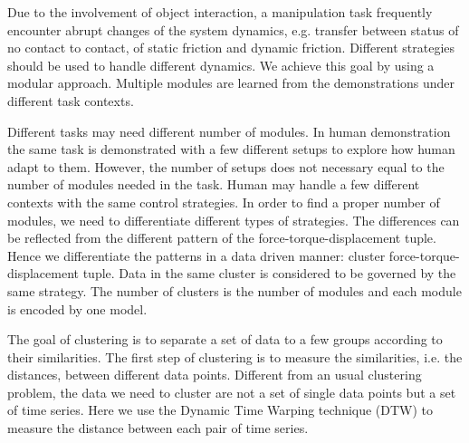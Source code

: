 \documentclass[preprint,12pt]{elsarticle}
\begin{document}
Due to the involvement of object interaction, a manipulation task frequently encounter abrupt changes of the system dynamics, e.g. transfer between status of no contact to contact, of static friction and dynamic friction. Different strategies should be used to handle different dynamics. We achieve this goal by using a modular approach. Multiple modules are learned from the demonstrations under different task contexts. %


Different tasks may need different number of modules. In human demonstration the same task is demonstrated with a few different setups to explore how human adapt to them. However, the number of setups does not necessary equal to the number of modules needed in the task. Human may handle a few different contexts with the same control strategies. %
In order to find a proper number of modules, we need to differentiate different types of strategies. The differences can be reflected from the different pattern of the force-torque-displacement tuple. Hence we differentiate the patterns in a data driven manner: cluster force-torque-displacement tuple. Data in the same cluster is considered to be governed by the same strategy. The number of clusters is the number of modules and each module is encoded by one model.


The goal of clustering is to separate a set of data to a few groups according to their similarities. The first step of clustering is to measure the similarities, i.e. the distances, between different data points. Different from an usual clustering problem, the data we need to cluster are not a set of single data points but a set of time series. Here we use the Dynamic Time Warping technique (DTW) to measure the distance between each pair of time series.
\end{document}

